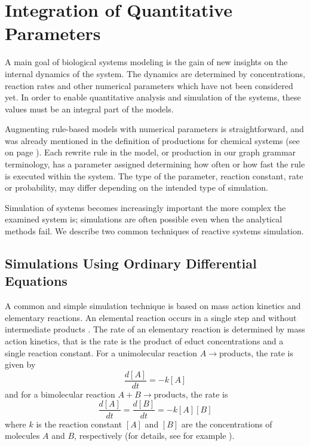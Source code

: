 
\section{Integration of Quantitative Parameters}
A main goal of biological systems modeling is the gain of new insights on the
internal dynamics of the system.  The dynamics are determined by
concentrations, reaction rates and other numerical parameters which have not
been considered yet.  In order to enable quantitative analysis and simulation
of the systems, these values must be an integral part of the models.

Augmenting rule-based models with numerical parameters is straightforward, and
was already mentioned in the definition of productions for chemical systems
(see  on page
\pageref{sec:model-react-rules}).  Each rewrite rule in the model, or
production in our graph grammar terminology, has a parameter assigned
determining how often or how fast the rule is executed within the system.  The
type of the parameter, reaction constant, rate or probability, may differ
depending on the intended type of simulation.

Simulation of systems becomes increasingly important the more complex the
examined system is; simulations are often possible even when the analytical
methods fail.  We describe two common techniques of reactive systems
simulation.

\subsection{Simulations Using Ordinary Differential Equations}
A common and simple simulation technique is based on mass action kinetics and
elementary reactions.  An elemental reaction occurs in a single step and
without intermediate products \cite{Svehla1993}.  The rate of an elementary
reaction is determined by mass action kinetics, that is the rate is the
product of educt concentrations and a single reaction constant.  For a
unimolecular reaction $A  \to \mathrm{products}$, the rate is given by
\[ \frac{d[A]}{dt} = - k [A] \]
and for a bimolecular reaction $A + B \to \mathrm{products}$, the rate is
\[ \frac{d[A]}{dt} = \frac{d[B]}{dt} = - k [A] [B] \]
where $k$ is the reaction constant $[A]$ and $[B]$ are the concentrations of
molecules $A$ and $B$, respectively (for details, see for example
\cite{Mortimer2003}).

